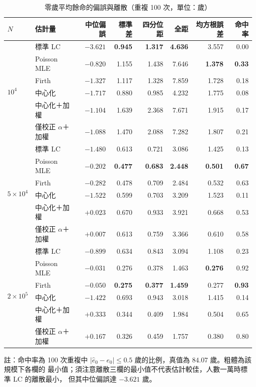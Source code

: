 \documentclass[UTF8, fontset=macnew, a4paper, 12pt]{ctexart}
\begin{document}
\begin{table}[H]
\centering
\caption{零歲平均餘命的偏誤與離散（重複 100 次，單位：歲）}
\small
\renewcommand{\arraystretch}{1.1}
\begin{tabular}{llrrrrrr}
\toprule
$N$ & 估計量 & 中位偏誤 & 標準差 & 四分位距 & 全距 & 均方根誤差 & 命中率\\
\midrule
\multirow{6}{*}{$10^4$}
 & 標準 LC             & $-3.621$ & \textbf{0.945} & \textbf{1.317} & \textbf{4.636} & 3.557 & 0.00\\
 & Poisson MLE          & \textbf{$-0.820$} & 1.155 & 1.438 & 7.646 & \textbf{1.378} & \textbf{0.33}\\
 & Firth               & $-1.327$ & 1.117 & 1.328 & 7.859 & 1.728 & 0.18\\
 & 中心化              & $-1.717$ & 0.880 & 0.985 & 4.232 & 1.775 & 0.08\\
 & 中心化＋加權        & $-1.104$ & 1.639 & 2.368 & 7.671 & 1.915 & 0.17\\
 & 僅校正 $\alpha$＋加權 & $-1.088$ & 1.470 & 2.088 & 7.282 & 1.807 & 0.21\\
\midrule
\multirow{6}{*}{$5\times10^4$}
 & 標準 LC             & $-1.480$ & 0.613 & 0.721 & 3.086 & 1.425 & 0.13\\
 & Poisson MLE          & $-0.202$ & \textbf{0.477} & \textbf{0.683} & \textbf{2.448} & \textbf{0.501} & \textbf{0.67}\\
 & Firth               & $-0.282$ & 0.478 & 0.709 & 2.484 & 0.532 & 0.63\\
 & 中心化              & $-1.522$ & 0.599 & 0.703 & 3.209 & 1.523 & 0.11\\
 & 中心化＋加權        & $+0.023$ & 0.670 & 0.933 & 3.921 & 0.668 & 0.53\\
 & 僅校正 $\alpha$＋加權 & \textbf{$+0.007$} & 0.613 & 0.759 & 3.366 & 0.610 & 0.58\\
\midrule
\multirow{6}{*}{$2\times10^5$}
 & 標準 LC             & $-0.899$ & 0.634 & 0.843 & 3.094 & 1.108 & 0.23\\
 & Poisson MLE          & \textbf{$-0.031$} & 0.276 & 0.378 & 1.463 & \textbf{0.276} & 0.92\\
 & Firth               & $-0.050$ & \textbf{0.275} & \textbf{0.377} & \textbf{1.459} & 0.277 & \textbf{0.93}\\
 & 中心化              & $-1.422$ & 0.693 & 0.943 & 3.018 & 1.415 & 0.14\\
 & 中心化＋加權        & $+0.333$ & 0.344 & 0.409 & 1.984 & 0.504 & 0.65\\
 & 僅校正 $\alpha$＋加權 & $+0.167$ & 0.326 & 0.459 & 1.757 & 0.380 & 0.80\\
\bottomrule
\end{tabular}

\vspace{2pt}
\parbox{0.92\textwidth}{\footnotesize 註：命中率為 100 次重複中
$|\hat e_0-e_0|\le0.5$ 歲的比例，真值為 $84.07$ 歲。粗體為該規模下各欄的
最小值；須注意離散三欄的最小值不代表估計較佳，人數一萬時標準 LC 的離散最小，
但其中位偏誤達 $-3.621$ 歲。}
\label{tab:e0var}
\end{table}
\end{document}
